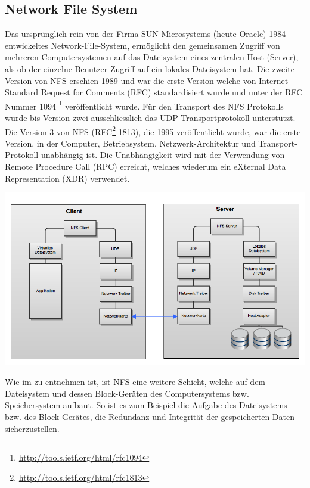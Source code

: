 \subsection{Network File System}
Das ursprünglich rein von der Firma SUN Microsystems (heute Oracle) 1984 entwickeltes Network-File-System, ermöglicht den gemeinsamen Zugriff von mehreren Computersystemen auf das Dateisystem eines zentralen Host (Server), als ob der einzelne Benutzer Zugriff auf ein lokales Dateisystem hat. Die zweite Version von NFS erschien 1989 und war die erste Version welche von Internet Standard Request for Comments (\gls{RFC}) standardisiert wurde und unter der \gls{RFC} Nummer 1094 \footnote{\url{http://tools.ietf.org/html/rfc1094}} veröffentlicht wurde. Für den Transport des NFS Protokolls wurde bis Version zwei ausschliesslich das \gls{UDP} Transportprotokoll unterstützt.
Die Version 3 von NFS (\gls{RFC}\footnote{\url{http://tools.ietf.org/html/rfc1813}} 1813), die 1995 veröffentlicht wurde, war die erste Version, in der Computer, Betriebsystem, Netzwerk-Architektur und Transport-Protokoll unabhängig ist. Die Unabhängigkeit wird mit der Verwendung von Remote Procedure Call (\gls{RPC}) erreicht, welches wiederum ein eXternal Data Representation (\gls{XDR}) verwendet. \cite{Stern2001}

\begin{center}
\includegraphics[width=\linewidth, keepaspectratio = true]{media/NFS.png}
\end{center}

Wie im  zu entnehmen ist, ist NFS eine weitere Schicht, welche auf dem Dateisystem und dessen Block-Geräten des Computersystems bzw. Speichersystem aufbaut. So ist es zum Beispiel die Aufgabe des Dateisystems bzw. des Block-Gerätes, die Redundanz und Integrität der gespeicherten Daten sicherzustellen. 


